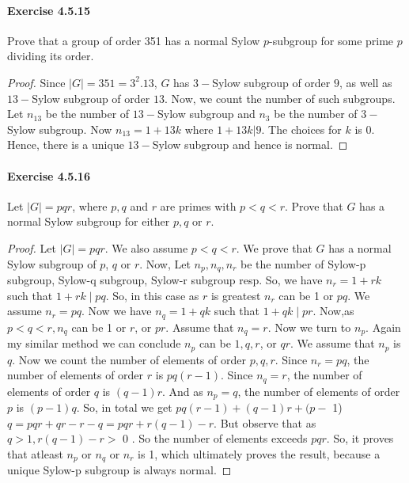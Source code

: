 \documentclass{article}
\theoremstyle{definition}
\begin{document}
\paragraph{Exercise 4.5.15} Prove that a group of order 351 has a normal Sylow $p$-subgroup for some prime $p$ dividing its order.
\begin{proof}
    Since $|G|=351=3^{2}.13$, $G$ has $3-$Sylow subgroup of order $9$, as well as $13-$Sylow subgroup of order $13$. Now, we count the number of such subgroups. Let $n_{13}$ be the number of $13-$Sylow subgroup and $n_{3}$ be the number of  $3-$Sylow subgroup. Now $n_{13}=1+13k$ where $1+13k|9$. The choices for $k$ is $0$. Hence, there is a unique $13-$Sylow subgroup and hence is normal.
\end{proof}



\paragraph{Exercise 4.5.16} Let $|G|=p q r$, where $p, q$ and $r$ are primes with $p<q<r$. Prove that $G$ has a normal Sylow subgroup for either $p, q$ or $r$.
\begin{proof}
    Let $|G|=p q r$. We also assume $p<q<r$. We prove that $G$ has a normal Sylow subgroup of $p$, $q$ or $r$. Now, Let $n_p, n_q, n_r$ be the number of Sylow-p subgroup, Sylow-q subgroup, Sylow-r subgroup resp. So, we have $n_r=1+r k$ such that $1+r k \mid p q$. So, in this case as $r$ is greatest $n_r$ can be 1 or $p q$. We assume $n_r=p q$. Now we have $n_q=1+q k$ such that $1+q k \mid p r$. Now,as $p<q<r, n_q$ can be 1 or $r$, or $p r$. Assume that $n_q=r$. Now we turn to $n_p$. Again my similar method we can conclude $n_p$ can be $1, q, r$, or $q r$. We assume that $n_p$ is $q$. Now we count the number of elements of order $p, q, r$. Since $n_r=p q$, the number of elements of order $r$ is $p q(r-1)$. Since $n_q=r$, the number of elements of order $q$ is $(q-1) r$. And as $n_p=q$, the number of elements of order $p$ is $(p-1) q$. So, in total we get $p q(r-1)+(q-1) r+(p-$ 1) $q=p q r+q r-r-q=p q r+r(q-1)-r$. But observe that as $q>1, r(q-1)-r>$ 0 . So the number of elements exceeds $p q r$. So, it proves that atleast $n_p$ or $n_q$ or $n_r$ is 1, which ultimately proves the result, because a unique Sylow-p subgroup is always normal.
\end{proof}
\end{document}
